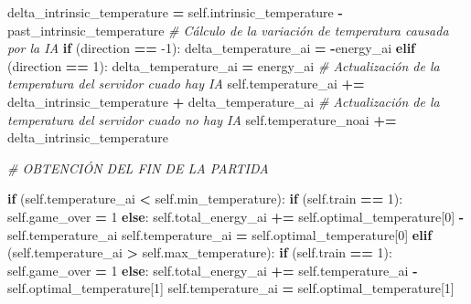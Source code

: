 \documentclass[]{book}
\newenvironment{Shaded}{\begin{snugshade}}{\end{snugshade}}
\newcommand{\CommentTok}[1]{\textcolor[rgb]{0.56,0.35,0.01}{\textit{#1}}}
\newcommand{\ControlFlowTok}[1]{\textcolor[rgb]{0.13,0.29,0.53}{\textbf{#1}}}
\newcommand{\DecValTok}[1]{\textcolor[rgb]{0.00,0.00,0.81}{#1}}
\newcommand{\NormalTok}[1]{#1}
\newcommand{\OperatorTok}[1]{\textcolor[rgb]{0.81,0.36,0.00}{\textbf{#1}}}
\newcommand{\VariableTok}[1]{\textcolor[rgb]{0.00,0.00,0.00}{#1}}
\begin{document}
\begin{Shaded}
\begin{Highlighting}[]
\NormalTok{        delta_intrinsic_temperature }\OperatorTok{=} \VariableTok{self}\NormalTok{.intrinsic_temperature}
                                      \OperatorTok{-}\NormalTok{ past_intrinsic_temperature}
        \CommentTok{# Cálculo de la variación de temperatura causada por la IA}
        \ControlFlowTok{if}\NormalTok{ (direction }\OperatorTok{==} \DecValTok{-1}\NormalTok{):}
\NormalTok{            delta_temperature_ai }\OperatorTok{=} \OperatorTok{-}\NormalTok{energy_ai}
        \ControlFlowTok{elif}\NormalTok{ (direction }\OperatorTok{==} \DecValTok{1}\NormalTok{):}
\NormalTok{            delta_temperature_ai }\OperatorTok{=}\NormalTok{ energy_ai}
        \CommentTok{# Actualización de la temperatura del servidor cuado hay IA}
        \VariableTok{self}\NormalTok{.temperature_ai }\OperatorTok{+=}\NormalTok{ delta_intrinsic_temperature }\OperatorTok{+}\NormalTok{ delta_temperature_ai}
        \CommentTok{# Actualización de la temperatura del servidor cuado no hay IA}
        \VariableTok{self}\NormalTok{.temperature_noai }\OperatorTok{+=}\NormalTok{ delta_intrinsic_temperature}
        
        \CommentTok{# OBTENCIÓN DEL FIN DE LA PARTIDA}
        
        \ControlFlowTok{if}\NormalTok{ (}\VariableTok{self}\NormalTok{.temperature_ai }\OperatorTok{<} \VariableTok{self}\NormalTok{.min_temperature):}
            \ControlFlowTok{if}\NormalTok{ (}\VariableTok{self}\NormalTok{.train }\OperatorTok{==} \DecValTok{1}\NormalTok{):}
                \VariableTok{self}\NormalTok{.game_over }\OperatorTok{=} \DecValTok{1}
            \ControlFlowTok{else}\NormalTok{:}
                \VariableTok{self}\NormalTok{.total_energy_ai }\OperatorTok{+=} \VariableTok{self}\NormalTok{.optimal_temperature[}\DecValTok{0}\NormalTok{]}
                                        \OperatorTok{-} \VariableTok{self}\NormalTok{.temperature_ai}
                \VariableTok{self}\NormalTok{.temperature_ai }\OperatorTok{=} \VariableTok{self}\NormalTok{.optimal_temperature[}\DecValTok{0}\NormalTok{]}
        \ControlFlowTok{elif}\NormalTok{ (}\VariableTok{self}\NormalTok{.temperature_ai }\OperatorTok{>} \VariableTok{self}\NormalTok{.max_temperature):}
            \ControlFlowTok{if}\NormalTok{ (}\VariableTok{self}\NormalTok{.train }\OperatorTok{==} \DecValTok{1}\NormalTok{):}
                \VariableTok{self}\NormalTok{.game_over }\OperatorTok{=} \DecValTok{1}
            \ControlFlowTok{else}\NormalTok{:}
                \VariableTok{self}\NormalTok{.total_energy_ai }\OperatorTok{+=} \VariableTok{self}\NormalTok{.temperature_ai}
                                        \OperatorTok{-} \VariableTok{self}\NormalTok{.optimal_temperature[}\DecValTok{1}\NormalTok{]}
                \VariableTok{self}\NormalTok{.temperature_ai }\OperatorTok{=} \VariableTok{self}\NormalTok{.optimal_temperature[}\DecValTok{1}\NormalTok{]}
        

\end{Highlighting}
\end{Shaded}
\end{document}
